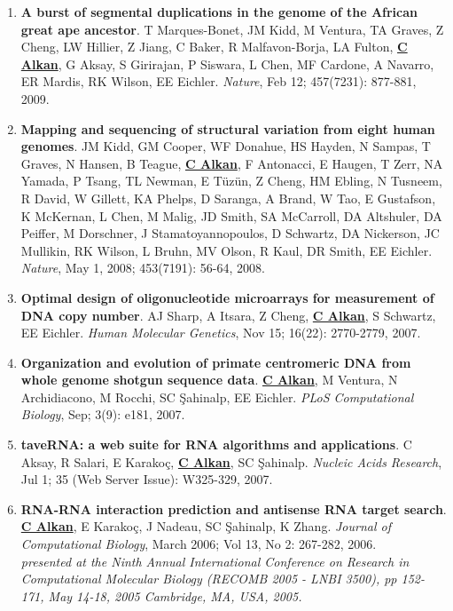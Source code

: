 \begin{enumerate}
\item

{\bf A burst of segmental duplications in the genome of the African great ape ancestor}. T Marques-Bonet, JM Kidd, M Ventura, TA Graves, Z Cheng, LW Hillier, Z Jiang, 
C Baker, R Malfavon-Borja, LA Fulton, {\bf {\underline{C Alkan}}}, G Aksay, S Girirajan,
 P Siswara, L Chen, MF Cardone, A Navarro, ER Mardis,
 RK Wilson, EE Eichler. {\em Nature}, Feb 12;  457(7231): 877-881, 2009.


\item
 {\bf Mapping and sequencing of structural variation from eight human genomes}.
 JM Kidd, GM Cooper, WF Donahue, HS Hayden, 
 N Sampas, T Graves, N Hansen, B Teague, {\bf {\underline{C Alkan}}},  F Antonacci, 
 E Haugen, T Zerr, NA Yamada, P Tsang,  TL Newman, E T\"{u}z\"{u}n, 
 Z Cheng, HM Ebling, N Tusneem, R David, W Gillett, KA Phelps, 
 D Saranga, A Brand, W Tao, E Gustafson, K McKernan, L Chen, 
 M Malig, JD Smith, SA McCarroll, DA Altshuler,  
 DA Peiffer, M Dorschner, J Stamatoyannopoulos, D Schwartz,  
 DA Nickerson, JC Mullikin, RK Wilson, L Bruhn, 
 MV Olson, R Kaul, DR Smith, EE Eichler.
 {\em Nature}, May 1, 2008;  453(7191): 56-64, 2008.


\item
 {\bf Optimal design of oligonucleotide microarrays for measurement of DNA copy number}.
 AJ Sharp, A Itsara, Z Cheng, {\bf {\underline{C Alkan}}}, S Schwartz, EE Eichler.
 {\em Human Molecular Genetics}, Nov 15;  16(22): 2770-2779, 2007.



\item
 {\bf Organization and evolution of primate centromeric DNA from whole genome shotgun sequence data}.
 {\bf {\underline{C Alkan}}}, M Ventura, N Archidiacono, M Rocchi, SC \c{S}ahinalp, EE Eichler.
 {\em PLoS Computational Biology}, Sep;  3(9): e181, 2007.


\item
 {\bf taveRNA: a web suite for RNA algorithms and applications}.
  C Aksay, R Salari, E Karako\c{c}, {\bf {\underline{C Alkan}}}, SC \c{S}ahinalp.
  {\em Nucleic Acids Research}, Jul 1;  35 (Web Server Issue): W325-329, 2007.

\clearpage
\item
 {\bf RNA-RNA interaction prediction and antisense RNA target search}.
  {\bf {\underline{C Alkan}}}, E Karako\c{c}, J Nadeau, SC \c{S}ahinalp,
  K Zhang.
  {\em Journal of Computational Biology}, March 2006;  Vol 13, No 2: 267-282, 2006. \\
\hspace*{1cm} {\footnotesize {\it presented at the Ninth Annual International Conference on Research in Computational Molecular Biology
    (RECOMB 2005 - LNBI 3500), pp 152-171, 
    May 14-18, 2005 Cambridge, MA, USA, 2005.}}



\end{enumerate}

